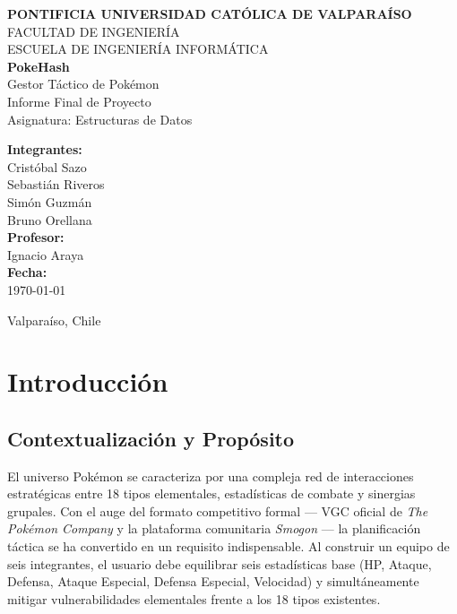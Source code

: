 \documentclass[12pt, letterpaper]{article}
\begin{document}

\begin{titlepage}
    \centering
    {\large\bfseries PONTIFICIA UNIVERSIDAD CATÓLICA DE VALPARAÍSO}\\[0.15cm]
    {\large FACULTAD DE INGENIERÍA}\\[0.15cm]
    {\large ESCUELA DE INGENIERÍA INFORMÁTICA}\\[3cm]

    {\Huge\bfseries PokeHash}\\[0.35cm]
    {\Large Gestor Táctico de Pokémon}\\[1.2cm]
    {\large Informe Final de Proyecto}\\[0.2cm]
    {\large Asignatura: Estructuras de Datos}\\[3cm]

    \begin{flushleft}
        \textbf{Integrantes:}\\[0.2cm]
        Cristóbal Sazo\\
        Sebastián Riveros\\
        Simón Guzmán\\
        Bruno Orellana\\[0.8cm]
        \textbf{Profesor:}\\
        Ignacio Araya\\[0.8cm]
        \textbf{Fecha:}\\
        \today
    \end{flushleft}

    \vfill
    {\small Valparaíso, Chile}
\end{titlepage}

\newpage
{}
\tableofcontents
\newpage
{}

\section{Introducción}

\subsection{Contextualización y Propósito}

El universo Pokémon se caracteriza por una compleja red de interacciones estratégicas entre 18 tipos elementales, estadísticas de combate y sinergias grupales. Con el auge del formato competitivo formal --- VGC oficial de \emph{The Pokémon Company} y la plataforma comunitaria \emph{Smogon} --- la planificación táctica se ha convertido en un requisito indispensable. Al construir un equipo de seis integrantes, el usuario debe equilibrar seis estadísticas base (HP, Ataque, Defensa, Ataque Especial, Defensa Especial, Velocidad) y simultáneamente mitigar vulnerabilidades elementales frente a los 18 tipos existentes.
\end{document}
